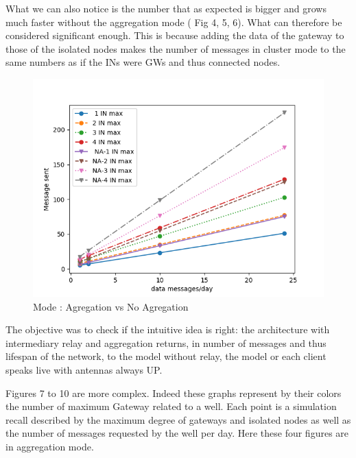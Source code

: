 \documentclass[conference]{IEEEtran}
\begin{document}
What we can also notice is the number that as expected is bigger and grows much faster without the aggregation mode ( Fig 4, 5, 6).
What can therefore be considered significant enough. This is because adding the data of the gateway to those of the isolated nodes makes the number of messages in cluster mode to the same numbers as if the INs were GWs and thus connected nodes.
\begin{figure}[htbp]
\centerline{\includegraphics[scale=0.5]{graphics_resultats/A/AvsNA.png}}
\caption{Mode : Agregation vs No Agregation}
\label{A}
\end{figure}

The objective was to check if the intuitive idea is right: the architecture with intermediary relay and aggregation returns, in number of messages and thus lifespan of the network, to the model without relay, the model or each client speaks live with antennas always UP.

Figures 7 to 10 are more complex. Indeed these graphs represent by their colors the number of maximum Gateway related to a well. Each point is a simulation recall described by the maximum degree of gateways and isolated nodes as well as the number of messages requested by the well per day. Here these four figures are in aggregation mode.
\end{document}
